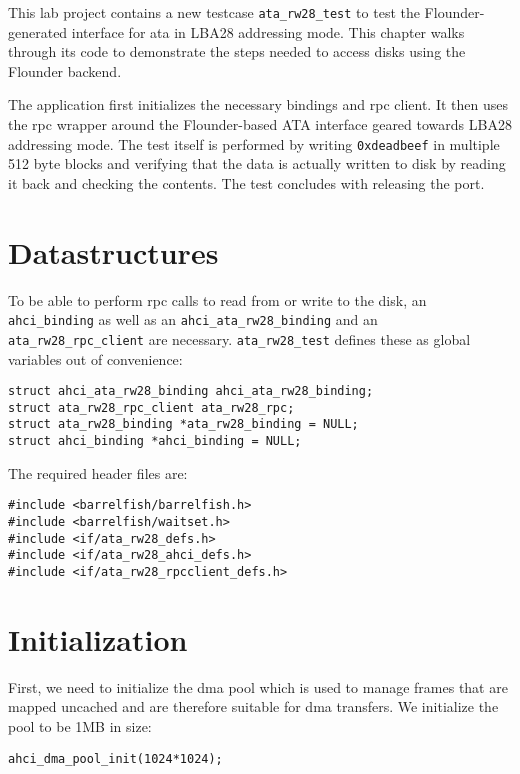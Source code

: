 This lab project contains a new testcase \verb+ata_rw28_test+ to test the
Flounder-generated interface for \acs{ata} in LBA28 addressing mode. This
chapter walks through its code to demonstrate the steps needed to access disks
using the Flounder backend.

The application first initializes the necessary bindings and \acs{rpc} client.
It then uses the \acs{rpc} wrapper around the Flounder-based ATA interface
geared towards LBA28 addressing mode. The test itself is performed by writing
\lstinline+0xdeadbeef+ in multiple 512 byte blocks and verifying that the data
is actually written to disk by reading it back and checking the contents. The
test concludes with releasing the port.

\section{Datastructures}

To be able to perform \acs{rpc} calls to read from or write to the disk, an
\lstinline+ahci_binding+ as well as an \lstinline+ahci_ata_rw28_binding+ and an
\lstinline+ata_rw28_rpc_client+ are necessary.  \lstinline+ata_rw28_test+
defines these as global variables out of convenience:

\begin{lstlisting}
struct ahci_ata_rw28_binding ahci_ata_rw28_binding;
struct ata_rw28_rpc_client ata_rw28_rpc;
struct ata_rw28_binding *ata_rw28_binding = NULL;
struct ahci_binding *ahci_binding = NULL;
\end{lstlisting}

The required header files are:

\begin{lstlisting}
#include <barrelfish/barrelfish.h>
#include <barrelfish/waitset.h>
#include <if/ata_rw28_defs.h>
#include <if/ata_rw28_ahci_defs.h>
#include <if/ata_rw28_rpcclient_defs.h>
\end{lstlisting}

\section{Initialization}

First, we need to initialize the \acs{dma} pool which is used to manage frames
that are mapped uncached and are therefore suitable for \acs{dma} transfers. We
initialize the pool to be 1MB in size:

\begin{lstlisting}
ahci_dma_pool_init(1024*1024);
\end{lstlisting}

